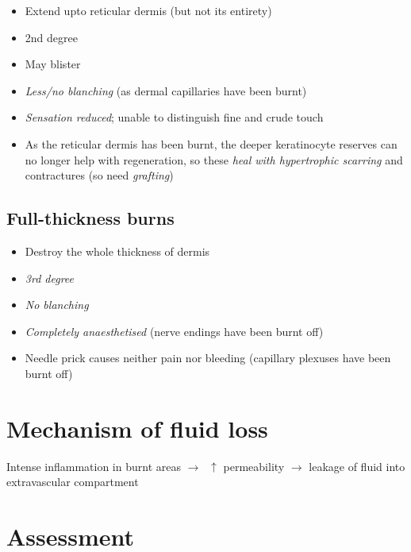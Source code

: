 \documentclass[
  12pt,
]{memoir}
\providecommand{\tightlist}{%
  \setlength{\itemsep}{0pt}\setlength{\parskip}{0pt}}
\begin{document}
\begin{itemize}
\tightlist
\item
  Extend upto reticular dermis (but not its entirety)
\item
  2nd degree
\item
  May blister
\item
  \emph{Less/no blanching} (as dermal capillaries have been burnt)
\item
  \emph{Sensation reduced}; unable to distinguish fine and crude touch
\item
  As the reticular dermis has been burnt, the deeper keratinocyte
  reserves can no longer help with regeneration, so these \emph{heal
  with hypertrophic scarring} and contractures (so need \emph{grafting})
\end{itemize}

\hypertarget{full-thickness-burns}{%
\subsection{Full-thickness burns}\label{full-thickness-burns}}

\begin{itemize}
\tightlist
\item
  Destroy the whole thickness of dermis
\item
  \emph{3rd degree}
\item
  \emph{No blanching}
\item
  \emph{Completely anaesthetised} (nerve endings have been burnt off)
\item
  Needle prick causes neither pain nor bleeding (capillary plexuses have
  been burnt off)
\end{itemize}

\hypertarget{mechanism-of-fluid-loss}{%
\section{Mechanism of fluid loss}\label{mechanism-of-fluid-loss}}

Intense inflammation in burnt areas \(\rightarrow\;\;\uparrow\)
permeability \(\rightarrow\) leakage of fluid into extravascular
compartment

\hypertarget{assessment}{%
\section{Assessment}\label{assessment}}
\end{document}
